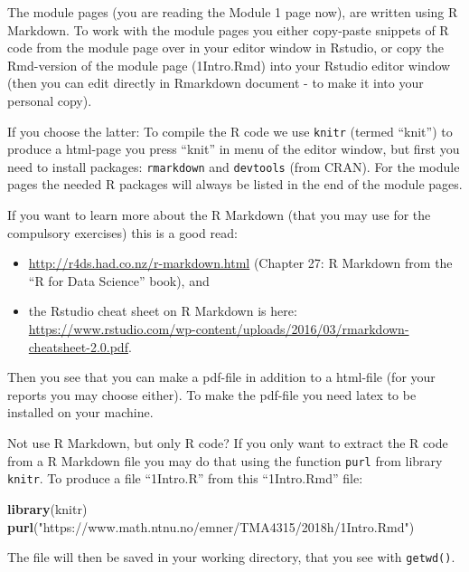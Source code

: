 \documentclass[
  ignorenonframetext,
]{beamer}
\newenvironment{Shaded}{\begin{snugshade}}{\end{snugshade}}
\newcommand{\FunctionTok}[1]{\textcolor[rgb]{0.13,0.29,0.53}{\textbf{#1}}}
\newcommand{\NormalTok}[1]{#1}
\newcommand{\StringTok}[1]{\textcolor[rgb]{0.31,0.60,0.02}{#1}}
\begin{document}
\begin{frame}[fragile]
The module pages (you are reading the Module 1 page now), are written
using R Markdown. To work with the module pages you either copy-paste
snippets of R code from the module page over in your editor window in
Rstudio, or copy the Rmd-version of the module page (1Intro.Rmd) into
your Rstudio editor window (then you can edit directly in Rmarkdown
document - to make it into your personal copy).

If you choose the latter: To compile the R code we use \texttt{knitr}
(termed ``knit'') to produce a html-page you press ``knit'' in menu of
the editor window, but first you need to install packages:
\texttt{rmarkdown} and \texttt{devtools} (from CRAN). For the module
pages the needed R packages will always be listed in the end of the
module pages.

If you want to learn more about the R Markdown (that you may use for the
compulsory exercises) this is a good read:

\begin{itemize}
\item
  \url{http://r4ds.had.co.nz/r-markdown.html} (Chapter 27: R Markdown
  from the ``R for Data Science'' book), and
\item
  the Rstudio cheat sheet on R Markdown is here:
  \url{https://www.rstudio.com/wp-content/uploads/2016/03/rmarkdown-cheatsheet-2.0.pdf}.
\end{itemize}

Then you see that you can make a pdf-file in addition to a html-file
(for your reports you may choose either). To make the pdf-file you need
latex to be installed on your machine.
\end{frame}

\begin{frame}[fragile]
\begin{block}{Not use R Markdown, but only R code?}
\label{not-use-r-markdown-but-only-r-code}
If you only want to extract the R code from a R Markdown file you may do
that using the function \texttt{purl} from library \texttt{knitr}. To
produce a file ``1Intro.R'' from this ``1Intro.Rmd'' file:

\begin{Shaded}
\begin{Highlighting}[]
\FunctionTok{library}\NormalTok{(knitr)}
\FunctionTok{purl}\NormalTok{(}\StringTok{"https://www.math.ntnu.no/emner/TMA4315/2018h/1Intro.Rmd"}\NormalTok{)}
\end{Highlighting}
\end{Shaded}

The file will then be saved in your working directory, that you see with
\texttt{getwd()}.
\end{block}
\end{frame}
\end{document}

